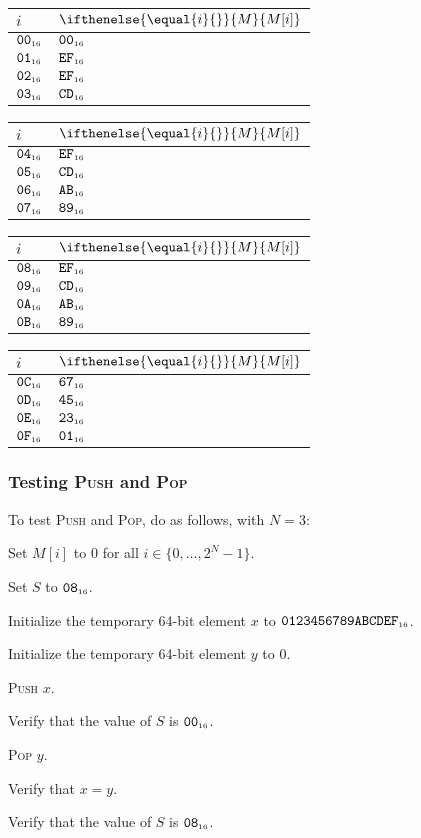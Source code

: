 \documentclass[a4paper,12pt]{article}
\makeatletter
\newcommand{\num}[1]{\texttt{#1}}
\newcommand{\hex}[1]{\num{#1}_{\textup{\tiny 16}}}
\newcommand{\MEM}[1]{\ifthenelse{\equal{#1}{}}{M}{M[#1]}}
\newcommand{\SP}{S}
\newcommand{\range}[2]{\{#1,\ldots,#2\}}
\newcommand{\proc}[1]{\textsc{#1}}
\newenvironment{memtable}{%
  \begin{trivlist}
    \item
    }{%
    \end{trivlist}}
\newenvironment{memcolumn}{%
  \begin{tabular}{@{}ll@{}}
    $i$ & $\MEM{i}$ \\
    \hline}
    {%
  \end{tabular}}
\newcommand{\memspace}{\qquad}
\makeatother
\begin{document}
\begin{memtable}
  \begin{memcolumn}
    $\hex{00}$ & $\hex{00}$ \\
    $\hex{01}$ & $\hex{EF}$ \\
    $\hex{02}$ & $\hex{EF}$ \\
    $\hex{03}$ & $\hex{CD}$ \\
  \end{memcolumn}
  \memspace
  \begin{memcolumn}
    $\hex{04}$ & $\hex{EF}$ \\
    $\hex{05}$ & $\hex{CD}$ \\
    $\hex{06}$ & $\hex{AB}$ \\
    $\hex{07}$ & $\hex{89}$ \\
  \end{memcolumn}
  \memspace
  \begin{memcolumn}
    $\hex{08}$ & $\hex{EF}$ \\
    $\hex{09}$ & $\hex{CD}$ \\
    $\hex{0A}$ & $\hex{AB}$ \\
    $\hex{0B}$ & $\hex{89}$ \\
  \end{memcolumn}
  \memspace
  \begin{memcolumn}
    $\hex{0C}$ & $\hex{67}$ \\
    $\hex{0D}$ & $\hex{45}$ \\
    $\hex{0E}$ & $\hex{23}$ \\
    $\hex{0F}$ & $\hex{01}$ \\
  \end{memcolumn}
\end{memtable}

\subsubsection{Testing \proc{Push} and \proc{Pop}}

To test \proc{Push} and \proc{Pop}, do as follows, with $N=3$:
\begin{stepnumbers}
\item Set $M[i]$ to 0 for all $i \in \range{0}{2^N-1}$.
\item Set $\SP$ to $\hex{08}$.
\item Initialize the temporary 64-bit element $x$ to $\hex{0123456789ABCDEF}$.
\item Initialize the temporary 64-bit element $y$ to $0$.
\item \proc{Push} $x$.
\item Verify that the value of $\SP$ is $\hex{00}$.
\item \proc{Pop} $y$.
\item Verify that $x=y$.
\item Verify that the value of $\SP$ is $\hex{08}$.
\end{stepnumbers}
\end{document}

